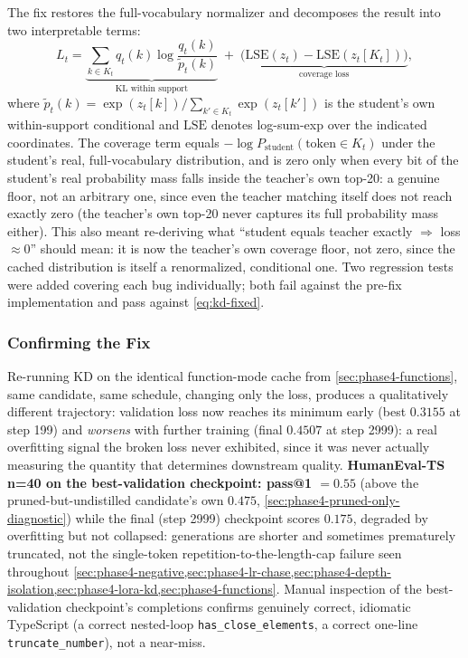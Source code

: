 \documentclass{article}
\theoremstyle{plain}
\theoremstyle{definition}
\theoremstyle{remark}
\begin{document}
The fix restores the full-vocabulary normalizer and decomposes the
result into two interpretable terms:
\begin{equation}
\label{eq:kd-fixed}
L_t = \underbrace{\sum_{k \in K_t} q_t(k) \log \frac{q_t(k)}{\tilde p_t(k)}}_{\text{KL within support}} \;+\; \underbrace{\Big(\mathrm{LSE}(z_t) - \mathrm{LSE}(z_t[K_t])\Big)}_{\text{coverage loss}},
\end{equation}
where $\tilde p_t(k) = \exp(z_t[k]) / \sum_{k' \in K_t}\exp(z_t[k'])$ is
the student's own within-support conditional and $\mathrm{LSE}$ denotes
log-sum-exp over the indicated coordinates. The coverage term equals
$-\log P_{\text{student}}(\text{token}\in K_t)$ under the student's
real, full-vocabulary distribution, and is zero only when every bit of
the student's real probability mass falls inside the teacher's own
top-20: a genuine floor, not an arbitrary one, since even the teacher
matching itself does not reach exactly zero (the teacher's own top-20
never captures its full probability mass either). This also meant
re-deriving what ``student equals teacher exactly $\Rightarrow$ loss
$\approx 0$'' should mean: it is now the teacher's own coverage floor,
not zero, since the cached distribution is itself a renormalized,
conditional one. Two regression tests were added covering each bug
individually; both fail against the pre-fix implementation and pass
against \cref{eq:kd-fixed}.

\subsubsection{Confirming the Fix}
\label{sec:phase4-fix-confirmed}

Re-running KD on the identical function-mode cache from
\cref{sec:phase4-functions}, same candidate, same schedule, changing
only the loss, produces a qualitatively different trajectory:
validation loss now reaches its minimum early (best $0.3155$ at step
199) and \emph{worsens} with further training (final $0.4507$ at step
2999): a real overfitting signal the broken loss never exhibited,
since it was never actually measuring the quantity that determines
downstream quality. \textbf{HumanEval-TS n=40 on the best-validation
checkpoint: pass@1 $=0.55$} (above the pruned-but-undistilled
candidate's own $0.475$, \cref{sec:phase4-pruned-only-diagnostic})
while the final (step 2999) checkpoint scores $0.175$, degraded by
overfitting but not collapsed: generations are shorter and sometimes
prematurely truncated, not the single-token repetition-to-the-length-cap
failure seen throughout
\cref{sec:phase4-negative,sec:phase4-lr-chase,sec:phase4-depth-isolation,sec:phase4-lora-kd,sec:phase4-functions}.
Manual inspection of the best-validation checkpoint's completions
confirms genuinely correct, idiomatic TypeScript (a correct nested-loop
\texttt{has\_close\_elements}, a correct one-line \texttt{truncate\_number}),
not a near-miss.
\end{document}
